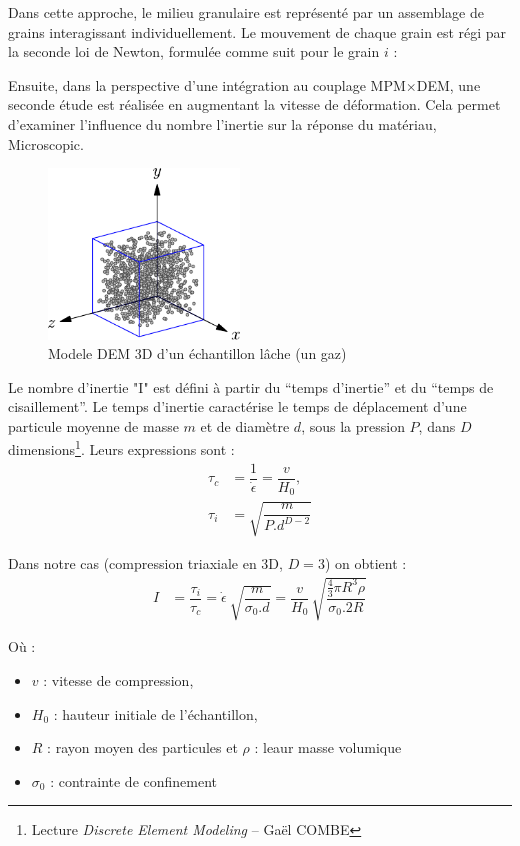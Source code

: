 \documentclass[5p,authoryear,square]{elsarticle}
\begin{document}
Dans cette approche, le milieu granulaire est représenté par un assemblage de grains interagissant individuellement. Le mouvement de chaque grain est régi par la seconde loi de Newton, formulée comme suit pour le grain $i$ :

    Ensuite, dans la perspective d’une intégration au couplage MPM$\times$DEM, une seconde étude est réalisée en augmentant la vitesse de déformation. Cela permet d’examiner l’influence du nombre l'inertie sur la réponse du matériau,
Microscopic.
\begin{figure}[h] \centering
	\includegraphics[width=2in]{figures/modele.pdf}
	\caption[]{Modele DEM 3D d'un échantillon lâche (un gaz)}
	\label{echantillon} 
\end{figure}

    Le nombre d'inertie "I" est défini à partir du ``temps d'inertie'' et du ``temps de cisaillement''.
    Le temps d'inertie caractérise le temps de déplacement d'une particule moyenne de masse $m$ et de diamètre $d$, sous la pression $P$, dans $D$ dimensions\footnote{Lecture \textit{Discrete Element Modeling} – Gaël COMBE}. Leurs expressions sont :
    \begin{align}
        	\tau_c &= \dfrac{1}{\dot{\epsilon}} = \dfrac{v}{H_0}, \\
        	\tau_i &= \sqrt{\dfrac{m}{P.d^{D-2}}}
    \end{align}

    Dans notre cas (compression triaxiale en 3D, $D=3$) on obtient :
    \begin{align}
        I &= \dfrac{\tau_i}{\tau_c}
        = \dot{\epsilon}\ \sqrt{\dfrac{m}{\sigma_0.d}}
        = \dfrac{v}{H_0}\,\sqrt{\dfrac{\tfrac{4}{3}\pi R^3 \rho}{\sigma_{0}.2R}}
    \end{align}

    Où :
    \begin{itemize}
        \item $v$ : vitesse de compression,
        \item $H_0$ : hauteur initiale de l'échantillon,
        \item $R$ : rayon moyen des particules et $\rho$ : leaur masse volumique 
        \item $\sigma_{0}$ : contrainte de confinement
    \end{itemize}
\end{document}
